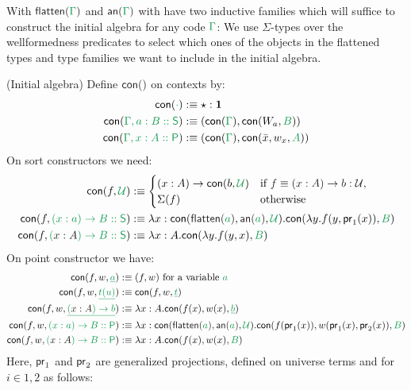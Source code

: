 \documentclass[12pt,headings=optiontohead,openany,oneside,a4paper]{book}
\theoremstyle{definition}
\newcommand{\unit}{\mathbf{1}}
\newcommand{\UU}{\mathcal{U}}
\newcommand{\pr}{\mathsf{pr}}
\newcommand{\gr}[1]{{\color{ForestGreen}#1}}
\newcommand{\grm}[1]{\ensuremath{\gr{#1}}}
\newcommand{\blm}[1]{\ensuremath{{\color{Black}#1}}}
\newcommand{\Sc}{\mathsf{S}}
\newcommand{\Pc}{\mathsf{P}}
\newcommand{\con}[1]{\mathsf{con}(\grm{#1})}
\newcommand{\contwo}[2]{\mathsf{con}(#1,\grm{#2})}
\newcommand{\conthree}[3]{\mathsf{con}(#1, #2, \grm{#3})}
\newcommand{\flatten}[1]{\blm{\mathsf{flatten}(\grm{#1})}}
\newcommand{\annotate}[1]{\blm{\mathsf{an}(\grm{#1})}}
\begin{document}
With \grm{\flatten{\Gamma}} and \grm{\annotate{\Gamma}} with have two inductive
families which will suffice to construct the initial algebra for any code \grm{\Gamma}:
We use $\Sigma$-types over the wellformedness predicates to select which ones of
the objects in the flattened types and type families we want to include in the
initial algebra.

\begin{defn}(Initial algebra)
Define \blm{\con{}} on contexts by:
\begin{align*}
\con{\cdot} &:\equiv \star : \unit \\
\con{\Gamma, a : B :: \Sc} &:\equiv (\con{\Gamma}, \contwo{W_a}{B}) \\
\con{\Gamma, x : A :: \Pc} &:\equiv (\con{\Gamma}, \conthree{\bar{x}}{w_x}{A}) \\
\end{align*}
On sort constructors we need:
\begin{align*}
\contwo{f}{\UU} &:\equiv
\begin{cases}
(x : A) \to \contwo{b}{\UU} & \text{if \blm{f \equiv (x : A) \to b : \UU},} \\
\Sigma(f) & \text{otherwise} %
\end{cases}\\
\contwo{f}{(x : a) \to B :: \Sc} &:\equiv \lambda x : \conthree{\flatten{a}}{\annotate{a}}{\UU}. \contwo{\lambda y. f(y, \pr_1(x))}{B} \\ %
\contwo{f}{(\blm{x : A}) \to B :: \Sc} &:\equiv \lambda x : A. \contwo{\lambda y. f(y, x)}{B}
\end{align*}
On point constructor we have:
\begin{align*}
\conthree{f}{w}{\underline{a}} &:\equiv (f, w) \text{ for a variable \grm{a}} \\
\conthree{f}{w}{\underline{t(u)}} &:\equiv \conthree{f}{w}{\underline{t}} \\
\conthree{f}{w}{\underline{(\blm{x : A}) \to b}} &:\equiv \lambda x : A. \conthree{f(x)}{w(x)}{\underline{b}} \\
\conthree{f}{w}{(x : a) \to B :: \Pc} &:\equiv
\lambda x : \conthree{\flatten{a}}{\annotate{a}}{\UU}. \conthree{f(\pr_1(x))}{w(\pr_1(x), \pr_2(x))}{B} \\ %
\conthree{f}{w}{(\blm{x : A}) \to B :: \Pc} &:\equiv
\lambda x : A. \conthree{f(x)}{w(x)}{B}
\end{align*}
Here, \blm{\pr_1} and \blm{\pr_2} are generalized projections, defined on universe
terms and for $i \in {1, 2}$ as follows:

\end{defn}
\end{document}
